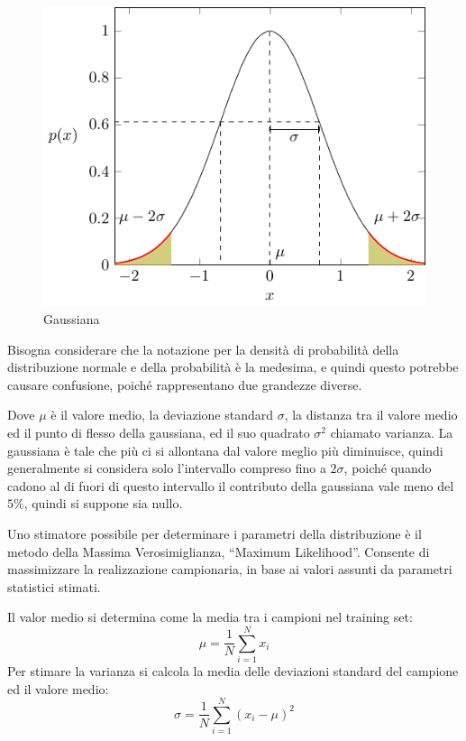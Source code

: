 \documentclass{article}
\numberwithin{equation}{subsection}
\begin{document}
\begin{figure}[H]%
    \centering%
    \includegraphics[scale=0.8]{gaussiana.pdf}%
    \caption{Gaussiana}%
\end{figure}

Bisogna considerare che la notazione per la densità di probabilità della distribuzione normale e della probabilità è la medesima, e quindi questo potrebbe causare confusione, poiché rappresentano due grandezze diverse. 

Dove $\mu$ è il valore medio, la deviazione standard $\sigma$, la distanza tra il valore medio ed il punto di flesso della gaussiana, ed il suo quadrato $\sigma^2$ chiamato varianza. 
La gaussiana è tale che più ci si allontana dal valore meglio più diminuisce, quindi generalmente si considera solo l'intervallo compreso fino a $2\sigma$, poiché quando cadono al di fuori di questo intervallo il contributo della gaussiana vale meno del $5\%$, quindi si suppone sia nullo. 

Uno stimatore possibile per determinare i parametri della distribuzione è il metodo della 
Massima Verosimiglianza, ``Maximum Likelihood''. Consente di massimizzare la realizzazione campionaria, in base ai valori assunti da parametri statistici stimati. 

Il valor medio si determina come la media tra i campioni nel training set:
\begin{equation*}
    \mu=\displaystyle\frac{1}{N}\sum_{i=1}^Nx_i
\end{equation*} 
Per stimare la varianza si calcola la media delle deviazioni standard del campione ed il valore medio:
\begin{equation*}
    \sigma=\displaystyle\frac{1}{N}\sum_{i=1}^N(x_i-\mu)^2
\end{equation*}
\end{document}
